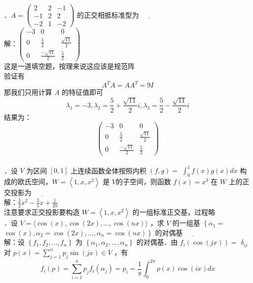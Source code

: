 \documentclass[UTF8]{ctexart}
\begin{document}
．$A=\left(\begin{array}{ccc}2 & 2 & -1 \\ -1 & 2 & 2 \\ -2 & 1 & -2\end{array}\right)$ 的正交相抵标准型为 $\underline{\hspace{1cm}}$\\
解：$\left(\begin{array}{ccc}-3 & 0 & 0 \\ 0 & \frac{5}{2} & \frac{\sqrt{11}}{2} \\ 0 & \frac{-\sqrt{11}}{2} & \frac{5}{2}\end{array}\right)$\\
这是一道填空题，按理来说这应该是规范阵\\
验证有 
$$A^{T} A=A A^{T}=9 I$$
那我们只用计算 $A$ 的特征值即可\\
$$\lambda_{1}=-3, \lambda_{2}=\frac{5}{2}+\frac{\sqrt{11}}{2} i, \lambda_{3}=\frac{5}{2}-\frac{\sqrt{11}}{2} i$$
结果为：$$\left(\begin{array}{ccc}-3 & 0 & 0 \\ 0 & \frac{5}{2} & \frac{\sqrt{11}}{2} \\ 0 & \frac{-\sqrt{11}}{2} & \frac{5}{2}\end{array}\right)$$\\



．设 $V$ 为区间 $[0,1]$ 上连续函数全体按照内积 $(f, g)=$ $\int_{0}^{1} f(x) g(x) d x$ 构成的欧氏空间，$W=\left\langle 1, x, x^{2}\right\rangle$ 是 $V $的子空间，则函数 $f(x)=x^{3}$ 在 $W$ 上的正交投影为 $\underline{\hspace{1cm}}$\\
解：$\frac{3}{2} x^{2}-\frac{3}{5} x+\frac{1}{20}$\\
注意要求正交投影要构造 $W=\left\langle 1, x, x^{2}\right\rangle$ 的一组标准正交基，过程略\\



．设 $V=\langle\cos (x), \cos (2 x), \ldots, \cos (n x)\rangle$ ，求 $V$ 的一组基 $\left\{\alpha_{1}=\right.$ $\left.\cos (x), \alpha_{2}=\cos (2 x), \ldots, \alpha_{n}=\cos (n x)\right\}$ 的对偶基 $\underline{\hspace{1cm}}$\\
解：设 $\left\{f_{1}, f_{2}, \ldots, f_{n}\right\}$ 为 $\left\{\alpha_{1}, \alpha_{2}, \ldots, \alpha_{n}\right\}$ 的对偶基．由 $f_{i}(\cos (j x))=$ $\delta_{i j}$ 对 $p(x)=\sum_{j=1}^{n} p_{j} \sin (j x) \in V$ ，有
$$
f_{i}(p)=\sum_{i=1}^{\pi} p_{j} f_{i}\left(\alpha_{j}\right)=p_{i}=\frac{1}{\pi} \int_{0}^{2 \pi} p(x) \cos (i x) d x
$$\\
\end{document}
